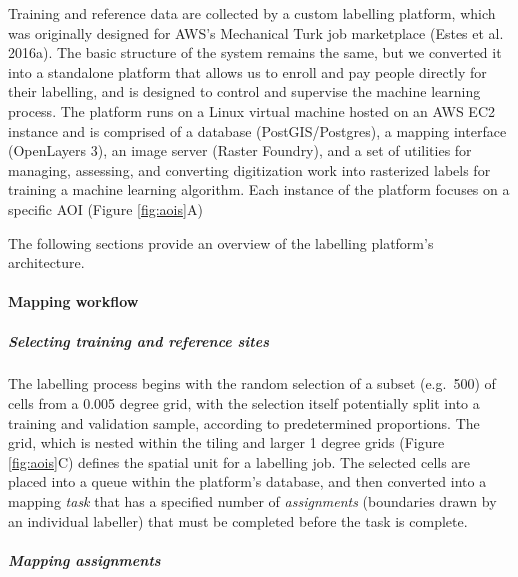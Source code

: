 \documentclass[11pt,a4paper]{article}
\begin{document}
Training and reference data are collected by a custom labelling
platform, which was originally designed for AWS's Mechanical Turk job
marketplace (Estes et al. 2016a). The basic structure of the system
remains the same, but we converted it into a standalone platform that
allows us to enroll and pay people directly for their labelling, and is
designed to control and supervise the machine learning process. The
platform runs on a Linux virtual machine hosted on an AWS EC2 instance
and is comprised of a database (PostGIS/Postgres), a mapping interface
(OpenLayers 3), an image server (Raster Foundry), and a set of utilities
for managing, assessing, and converting digitization work into
rasterized labels for training a machine learning algorithm. Each
instance of the platform focuses on a specific AOI (Figure
\ref{fig:aois}A)

The following sections provide an overview of the labelling platform's
architecture.

\hypertarget{mapping-workflow}{%
\paragraph{Mapping workflow}\label{mapping-workflow}}

\hypertarget{selecting-training-and-reference-sites}{%
\subparagraph{Selecting training and reference
sites}\label{selecting-training-and-reference-sites}}

The labelling process begins with the random selection of a subset
(e.g.~500) of cells from a 0.005 degree grid, with the selection itself
potentially split into a training and validation sample, according to
predetermined proportions. The grid, which is nested within the tiling
and larger 1 degree grids (Figure \ref{fig:aois}C) defines the spatial
unit for a labelling job. The selected cells are placed into a queue
within the platform's database, and then converted into a mapping
\emph{task} that has a specified number of \emph{assignments}
(boundaries drawn by an individual labeller) that must be completed
before the task is complete.

\hypertarget{mapping-assignments}{%
\subparagraph{Mapping assignments}\label{mapping-assignments}}
\end{document}
